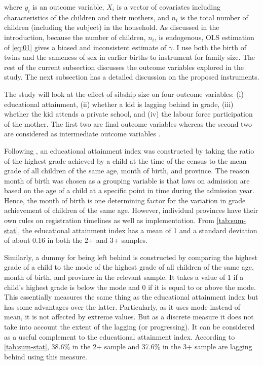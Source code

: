 where $ y_{i} $ is an outcome variable, $ X_{i} $ is a vector of covariates including characteristics of the children and their mothers, and $ n_{i} $ is the total number of children (including the subject) in the household. As discussed in the introduction, because the number of children, $ n_{i} $, is endogenous, OLS estimation of \eqref{eq:01} gives a biased and inconsistent estimate of $ \gamma $. I use both the birth of twins and the sameness of sex in earlier births to instrument for family size. The rest of the current subsection discusses the outcome variables explored in the study. The next subsection has a detailed discussion on the proposed instruments.  


The study will look at the effect of sibship size on four outcome variables: (i) educational attainment, (ii) whether a kid is lagging behind in grade, (iii) whether the kid attends a private school, and (iv) the labour force participation of the mother. The first two are final outcome variables whereas the second two are considered as intermediate outcome variables \parencite{caceres-delpiano_impacts_2006}. 

Following \textcite{rosenzweig_testing_1980}, an educational attainment index was constructed by taking the ratio of the highest grade achieved by a child at the time of the census to the mean grade of all children of the same age, month of birth, and province. The reason month of birth was chosen as a grouping variable is that laws on admission are based on the age of a child at a specific point in time during the admission year.  Hence, the month of birth is one determining factor for the variation in grade achievement of children of the same age. However, individual provinces have their own rules on registration timelines as well as implementation. From \autoref{tab:sum-stat}, the educational attainment index has a mean of 1 and a standard deviation of about 0.16 in both the 2+ and 3+ samples. %

Similarly, a dummy for being left behind is constructed by comparing the highest grade of a child to the mode of the highest grade of all children of the same age, month of birth, and province in the relevant sample. It takes a value of 1 if a child's highest grade is below the mode and 0 if it is equal to or above the mode. This essentially measures the same thing as the educational attainment index but has some advantages over the latter. Particularly, as it uses mode instead of mean, it is not affected by extreme values. But as a discrete measure it does not take into account the extent of the lagging (or progressing). It can be considered as a useful complement to the educational attainment index. According to \autoref{tab:sum-stat}, 38.6\% in the 2+ sample and 37.6\% in the 3+ sample are lagging behind using this measure. 

